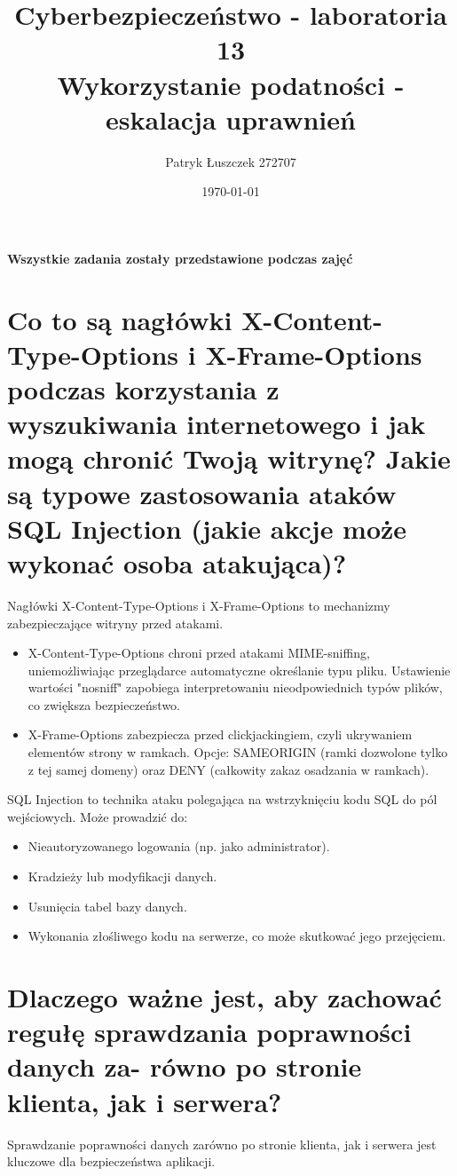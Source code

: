 \documentclass{article}
\title{%
  Cyberbezpieczeństwo - laboratoria 13 \\
  \large Wykorzystanie podatności - eskalacja uprawnień}
\author{Patryk Łuszczek 272707}
\date{\today}
\begin{document}
\maketitle
\newpage
\textbf{Wszystkie zadania zostały przedstawione podczas zajęć}




\section*{Co to są nagłówki X-Content-Type-Options i X-Frame-Options podczas korzystania
  z wyszukiwania internetowego i jak mogą chronić Twoją witrynę? Jakie są typowe
  zastosowania ataków SQL Injection (jakie akcje może wykonać osoba atakująca)?}
Nagłówki X-Content-Type-Options i X-Frame-Options to mechanizmy zabezpieczające witryny przed atakami.

\begin{itemize}
    \item X-Content-Type-Options chroni przed atakami MIME-sniffing, uniemożliwiając przeglądarce automatyczne określanie typu pliku. Ustawienie wartości "nosniff" zapobiega interpretowaniu nieodpowiednich typów plików, co zwiększa bezpieczeństwo.
    \item X-Frame-Options zabezpiecza przed clickjackingiem, czyli ukrywaniem elementów strony w ramkach. Opcje: SAMEORIGIN (ramki dozwolone tylko z tej samej domeny) oraz DENY (całkowity zakaz osadzania w ramkach).
\end{itemize}

SQL Injection to technika ataku polegająca na wstrzyknięciu kodu SQL do pól wejściowych. Może prowadzić do:

\begin{itemize}
    \item Nieautoryzowanego logowania (np. jako administrator).
    \item Kradzieży lub modyfikacji danych.
    \item Usunięcia tabel bazy danych.
    \item Wykonania złośliwego kodu na serwerze, co może skutkować jego przejęciem.
\end{itemize}

\section*{Dlaczego ważne jest, aby zachować regułę sprawdzania poprawności danych za-
  równo po stronie klienta, jak i serwera?}
Sprawdzanie poprawności danych zarówno po stronie klienta, jak i serwera jest kluczowe dla bezpieczeństwa aplikacji.
\end{document}
